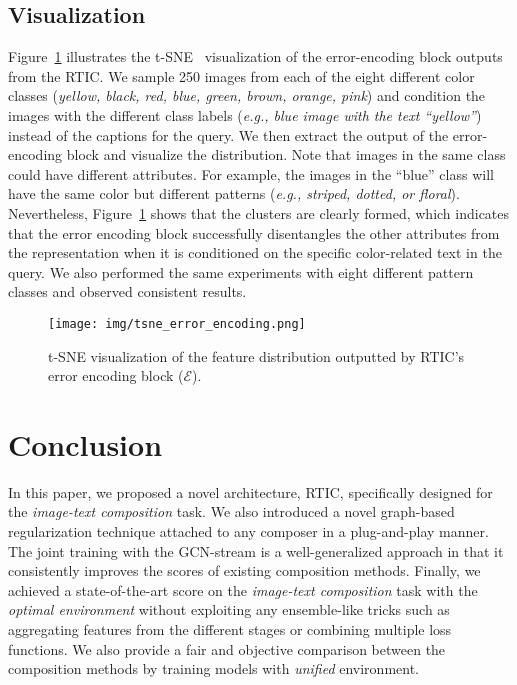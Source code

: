 \documentclass[10pt,twocolumn,letterpaper]{article}
\begin{document}
\subsection{Visualization}

Figure~\ref{fig:tsne_error_encoding} illustrates the t-SNE~\cite{van2008visualizing} visualization of the error-encoding block outputs from the RTIC. We sample 250 images from each of the eight different color classes (\textit{yellow, black, red, blue, green, brown, orange, pink}) and condition the images with the different class labels (\textit{e.g., blue image with the text ``yellow''}) instead of the captions for the query. We then extract the output of the error-encoding block and visualize the distribution. Note that images in the same class could have different attributes. For example, the images in the ``blue'' class will have the same color but different patterns (\textit{e.g., striped, dotted, or floral}). Nevertheless, Figure~\ref{fig:tsne_error_encoding} shows that the clusters are clearly formed, which indicates that the error encoding block successfully disentangles the other attributes from the representation when it is conditioned on the specific color-related text in the query. We also performed the same experiments with eight different pattern classes and observed consistent results.

\begin{figure}[t]
    \begin{center}
	    \texttt{[image: img/tsne\_error\_encoding.png]}
	\end{center}
	\caption{t-SNE visualization of the feature distribution outputted by RTIC's error encoding block ($\mathcal{E}$).}
	\label{fig:tsne_error_encoding}
\end{figure}


\section{Conclusion}
In this paper, we proposed a novel architecture, RTIC, specifically designed for the \textit{image-text composition} task. We also introduced a novel graph-based regularization technique attached to any composer in a plug-and-play manner. The joint training with the GCN-stream is a well-generalized approach in that it consistently improves the scores of existing composition methods. Finally, we achieved a state-of-the-art score on the \textit{image-text composition} task with the \textit{optimal environment} without exploiting any ensemble-like tricks such as aggregating features from the different stages or combining multiple loss functions. We also provide a fair and objective comparison between the composition methods by training models with \textit{unified} environment.
\end{document}
